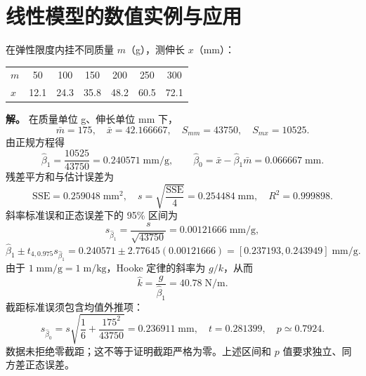 \section{线性模型的数值实例与应用}\label{sec:linear-model-examples}
\begin{exbox}[弹簧劲度系数的回归估计]
在弹性限度内挂不同质量 $m$（g），测伸长 $x$（mm）：

\begin{center}
\begin{tabular}{lcccccc}
\hline
$m$ & 50 & 100 & 150 & 200 & 250 & 300 \\
$x$ & 12.1 & 24.3 & 35.8 & 48.2 & 60.5 & 72.1 \\
\hline
\end{tabular}
\end{center}


\textbf{解。} 在质量单位 g、伸长单位 mm 下，
\[
 \bar m=175,\quad \bar x=42.166667,\quad
 S_{mm}=43750,\quad S_{mx}=10525.
\]
由正规方程得
\[
 \widehat\beta_1=\frac{10525}{43750}=0.240571\;\mathrm{mm/g},\qquad
 \widehat\beta_0=\bar x-\widehat\beta_1\bar m=0.066667\;\mathrm{mm}.
\]
残差平方和与估计误差为
\[
 \mathrm{SSE}=0.259048\;\mathrm{mm}^2,\quad
 s=\sqrt{\frac{\mathrm{SSE}}4}=0.254484\;\mathrm{mm},\quad
 R^2=0.999898.
\]
斜率标准误和正态误差下的 95\% 区间为
\[
 s_{\widehat\beta_1}=\frac{s}{\sqrt{43750}}=0.00121666\;\mathrm{mm/g},
\]
\[
 \widehat\beta_1\pm t_{4,0.975}s_{\widehat\beta_1}
 =0.240571\pm2.77645(0.00121666)
 =[0.237193,0.243949]\;\mathrm{mm/g}.
\]
由于 $1\;\mathrm{mm/g}=1\;\mathrm{m/kg}$，Hooke 定律的斜率为 $g/k$，从而
\[
 \widehat k=\frac{g}{\widehat\beta_1}=40.78\;\mathrm{N/m}.
\]
截距标准误须包含均值外推项：
\[
 s_{\widehat\beta_0}=s\sqrt{\frac16+\frac{175^2}{43750}}
 =0.236911\;\mathrm{mm},\quad
 t=0.281399,\quad p\simeq0.7924.
\]
数据未拒绝零截距；这不等于证明截距严格为零。上述区间和 $p$ 值要求独立、同方差正态误差。
\end{exbox}
